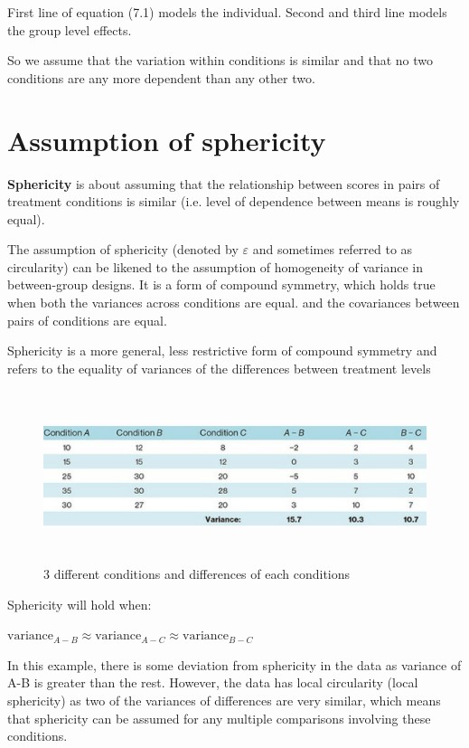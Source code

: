 First line of equation (7.1) models the individual. Second and third line models the group level effects.

So we assume that the variation within conditions is similar and that no two conditions are any more dependent than any other two.

\section{Assumption of sphericity}
\textbf{Sphericity} is about assuming that the relationship between scores in pairs of treatment conditions is similar (i.e. level of dependence between means is roughly equal).

The assumption of sphericity (denoted by $\varepsilon$ and sometimes referred to as circularity) can be likened to the assumption of homogeneity of variance in between-group designs. It is a form of compound symmetry, which holds true when both the variances across conditions are equal. and the covariances between pairs of conditions are equal.

Sphericity is a more general, less restrictive form of compound symmetry and refers to the equality of variances of the differences between treatment levels

\begin{figure}[h]
	\includegraphics[width=1\textwidth,height=50mm]{Chapter 15 GLM 4 Repeated-measures designs/sphericity.PNG}
	\caption{3 different conditions and differences of each conditions }
\end{figure}

Sphericity will hold when:
\begin{center}
$\text{variance}_{A-B} \approx \text{variance}_{A-C} \approx \text{variance}_{B-C} $
\end{center}

In this example, there is some deviation from sphericity in the data as variance of A-B is greater than the rest. However, the data has local circularity (local sphericity) as two of the variances of differences are very similar, which means that sphericity can be assumed for any multiple comparisons involving these conditions.


